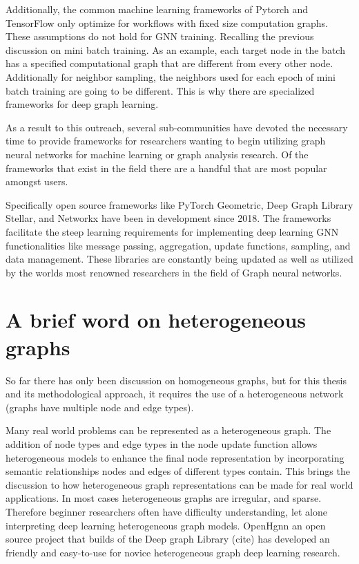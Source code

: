 Additionally, the common machine learning frameworks of Pytorch and TensorFlow only optimize for workflows with fixed size computation graphs. These assumptions do not hold for GNN training. Recalling the previous discussion on  mini batch training. As an example, each target node in the batch has a specified computational graph that are different from every other node. Additionally for neighbor sampling, the neighbors used for each epoch of mini batch training are going to be different. This is why there are specialized frameworks for deep graph learning.

As a result to this outreach, several sub-communities have devoted the necessary time to provide frameworks for researchers wanting to begin utilizing graph neural networks for machine learning or graph analysis research. Of the frameworks that exist in the field there are a handful that are most popular amongst users.

Specifically open source frameworks like PyTorch Geometric, Deep Graph Library Stellar, and Networkx have been in development since 2018. The frameworks facilitate the steep learning requirements for implementing deep learning GNN functionalities like message passing, aggregation, update functions, sampling, and data management. These libraries are constantly being updated as well as utilized by the worlds most renowned researchers in the field of Graph neural networks.
 
\section{A brief word on heterogeneous graphs}

So far there has only been discussion on homogeneous graphs, but for this thesis and its methodological approach, it requires the use of a heterogeneous network (graphs have multiple node and edge types).

Many real world problems can be represented as a heterogeneous graph. The addition of node types and edge types in the node update function allows heterogeneous models to enhance the final node representation by incorporating semantic relationships nodes and edges of different types contain. This brings the discussion to how heterogeneous graph representations can be made for real world applications. In most cases heterogeneous graphs are irregular, and sparse. Therefore beginner researchers often have difficulty understanding, let alone interpreting deep learning heterogeneous graph models. OpenHgnn \cite{hgRepAndApp2022} an open source project that builds of the Deep graph Library (cite) has developed an friendly and easy-to-use for novice heterogeneous graph deep learning research.

